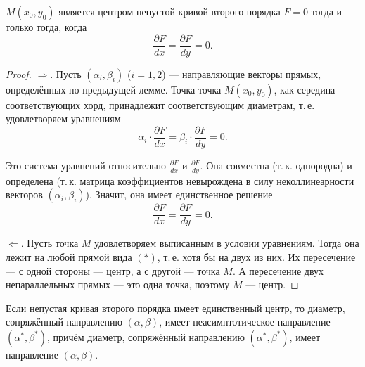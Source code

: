 \begin{theorem}
    $M(x_0, y_0)$ является центром непустой кривой второго порядка $F = 0$ тогда и только тогда, когда
    $$
    \frac{\partial F}{dx} = \frac{\partial F}{dy} = 0.
    $$
\end{theorem}

\begin{proof}
    $\Rightarrow$. Пусть $(\alpha_i, \beta_i)$ ($i = 1, 2$) --- направляющие векторы прямых, определённых по предыдущей лемме. Точка точка $M(x_0, y_0)$, как середина соответствующих хорд, принадлежит соответствующим диаметрам, т.\,е. удовлетворяем уравнениям
    $$
    \alpha_i\cdot\frac{\partial F}{dx} = \beta_i\cdot\frac{\partial F}{dy} = 0.
    $$

    Это система уравнений относительно $\displaystyle\frac{\partial F}{dx}$ и $\displaystyle\frac{\partial F}{dy}$. Она совместна (т.\,к. однородна) и определена (т.\,к. матрица коэффициентов невырождена в силу неколлинеарности векторов $(\alpha_i, \beta_i)$). Значит, она имеет единственное решение
    $$
    \frac{\partial F}{dx} = \frac{\partial F}{dy} = 0.
    $$

    $\Leftarrow$. Пусть точка $M$ удовлетворяем выписанным в условии уравнениям. Тогда она лежит на любой прямой вида $(\ast)$, т.\,е. хотя бы на двух из них. Их пересечение --- с одной стороны --- центр, а с другой --- точка $M$. А пересечение двух непараллельных прямых --- это одна точка, поэтому $M$ --- центр.
\end{proof}

\begin{theorem}
    Если непустая кривая второго порядка имеет единственный центр, то диаметр, сопряжённый направлению $(\alpha, \beta)$, имеет неасимптотическое направление $(\alpha^\ast, \beta^\ast)$, причём диаметр, сопряжённый направлению $(\alpha^\ast, \beta^\ast)$, имеет направление $(\alpha, \beta)$.
\end{theorem}

